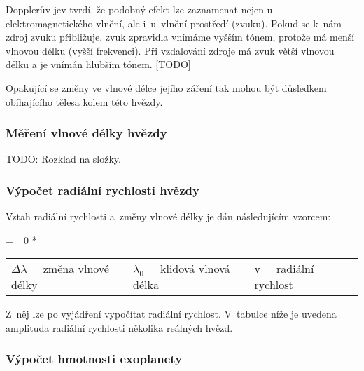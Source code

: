 \documentclass[a4paper,12pt]{article}
\begin{document}
\drawgimp

Dopplerův jev tvrdí, že podobný efekt lze zaznamenat nejen u elektromagnetického vlnění, ale i~u~vlnění prostředí (zvuku). Pokud se k~nám zdroj zvuku přibližuje, zvuk zpravidla vnímáme vyšším tónem, protože má menší vlnovou délku (vyšší frekvenci). Při vzdalování zdroje má zvuk větší vlnovou délku a je vnímán hlubším tónem. [TODO]

Opakující se změny ve vlnové délce jejího záření tak mohou být důsledkem obíhajícího tělesa kolem této hvězdy.~\cite{methods}

\subsubsection{Měření vlnové délky hvězdy}

TODO: Rozklad na složky.

\subsubsection{Výpočet radiální rychlosti hvězdy}

Vztah radiální rychlosti a~změny vlnové délky je dán následujícím vzorcem:

 {\Delta\lambda = \lambda_0 * }{
\begin{tabular}{lll}
	$\Delta\lambda$ = změna vlnové délky & $\lambda_0$ = klidová vlnová délka & v = radiální rychlost \
\end{tabular}
}

Z~něj lze po vyjádření vypočítat radiální rychlost. V~tabulce níže je uvedena amplituda radiální rychlosti několika reálných hvězd.


\subsubsection{Výpočet hmotnosti exoplanety}
\end{document}
